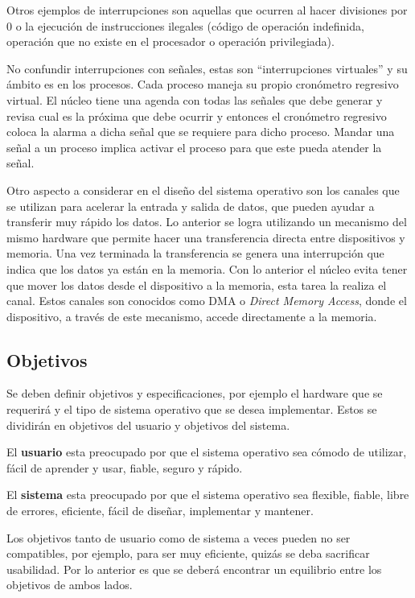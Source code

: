 Otros ejemplos de interrupciones son aquellas que ocurren al hacer divisiones
por 0 o la ejecución de instrucciones ilegales (código de operación indefinida,
operación que no existe en el procesador o operación privilegiada).

No confundir interrupciones con señales, estas son ``interrupciones virtuales''
y su ámbito es en los procesos. Cada proceso maneja su propio cronómetro
regresivo virtual. El núcleo tiene una agenda con todas las señales que debe
generar y revisa cual es la próxima que debe ocurrir y entonces el cronómetro
regresivo coloca la alarma a dicha señal que se requiere para dicho proceso.
Mandar una señal a un proceso implica activar el proceso para que este pueda
atender la señal.

Otro aspecto a considerar en el diseño del sistema operativo son los canales que
se utilizan para acelerar la entrada y salida de datos, que pueden ayudar a
transferir muy rápido los datos. Lo anterior se logra utilizando un mecanismo
del mismo hardware que permite hacer una transferencia directa entre
dispositivos y memoria. Una vez terminada la transferencia se genera una
interrupción que indica que los datos ya están en la memoria. Con lo anterior el
núcleo evita tener que mover los datos desde el dispositivo a la memoria, esta
tarea la realiza el canal. Estos canales son conocidos como DMA o \textit{Direct
Memory Access}, donde el dispositivo, a través de este mecanismo, accede
directamente a la memoria.

\subsection{Objetivos}
Se deben definir objetivos y especificaciones, por ejemplo el hardware que se
requerirá y el tipo de sistema operativo que se desea implementar. Estos se
dividirán en objetivos del usuario y objetivos del sistema.

El \textbf{usuario} esta preocupado por que el sistema operativo sea cómodo de
utilizar, fácil de aprender y usar, fiable, seguro y rápido.

El \textbf{sistema} esta preocupado por que el sistema operativo sea flexible,
fiable, libre de errores, eficiente, fácil de diseñar, implementar y mantener.

Los objetivos tanto de usuario como de sistema a veces pueden no ser
compatibles, por ejemplo, para ser muy eficiente, quizás se deba sacrificar
usabilidad. Por lo anterior es que se deberá encontrar un equilibrio entre los
objetivos de ambos lados.

